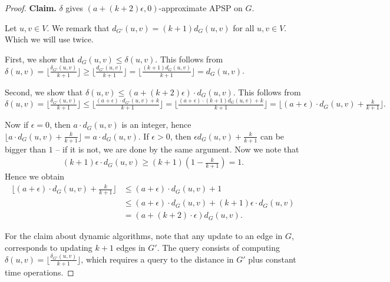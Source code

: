 \documentclass[11pt]{article}
\theoremstyle{definition}
\theoremstyle{remark}
\begin{document}
\begin{titlepage}
\begin{proof}
    \textbf{Claim.} $\delta$ gives $(a+(k+2)\epsilon,0)$-approximate APSP on $G$. 

    Let $u,v\in V$. We remark that $d_{G'}(u,v)=(k+1)d_G(u,v)$ for all $u,v\in V$. Which we will use twice. %
    
    First, we show that $d_G(u,v)\leq \delta(u,v)$.  This follows from $\delta(u,v) = \lfloor \tfrac{\delta_{G'}(u,v)}{k+1}\rfloor \geq \lfloor \tfrac{d_{G'}(u,v)}{k+1}\rfloor = \lfloor \tfrac{(k+1)d_G(u,v)}{k+1}\rfloor=d_G(u,v)$. 

    Second, we show that $\delta(u,v) \leq (a+(k+2)\epsilon)\cdot d_G(u,v)$. This follows from
    $$\delta(u,v) = \lfloor \tfrac{\delta_{G'}(u,v)}{k+1}\rfloor \leq \lfloor \tfrac{(a+\epsilon)\cdot d_{G'}(u,v)+k}{k+1}\rfloor = \lfloor \tfrac{(a+\epsilon)\cdot (k+1)d_{G}(u,v)+k}{k+1}\rfloor= \lfloor (a+\epsilon)\cdot d_G(u,v) +\tfrac{k}{k+1}\rfloor.$$

    Now if $\epsilon=0$, then $a\cdot d_G(u,v)$ is an integer, hence $\lfloor a\cdot d_G(u,v) +\tfrac{k}{k+1}\rfloor = a\cdot d_G(u,v) $. If $\epsilon>0$, then $\epsilon d_G(u,v)+ \tfrac{k}{k+1}$ can be bigger than $1$ -- if it is not, we are done by the same argument. Now we note that 
    \begin{align*}
        (k+1)\epsilon\cdot d_G(u,v) \geq (k+1)\left(1-\tfrac{k}{k+1}\right) =1.
    \end{align*}
    Hence we obtain 
    \begin{align*}
        \lfloor (a+\epsilon)\cdot d_G(u,v) +\tfrac{k}{k+1}\rfloor &\leq (a+\epsilon)\cdot d_G(u,v) +1 \\
        &\leq (a+\epsilon)\cdot d_G(u,v) + (k+1)\epsilon\cdot d_G(u,v)\\
        &= (a+(k+2)\cdot \epsilon)d_G(u,v).
    \end{align*}
    

    For the claim about dynamic algorithms, note that any update to an edge in $G$, corresponds to updating $k+1$ edges in $G'$. The query consists of computing $\delta(u,v) = \lfloor \tfrac{\delta_{G'}(u,v)}{k+1}\rfloor$, which requires a query to the distance in $G'$ plus constant time operations. 
\end{proof}


\end{titlepage}
\end{document}
